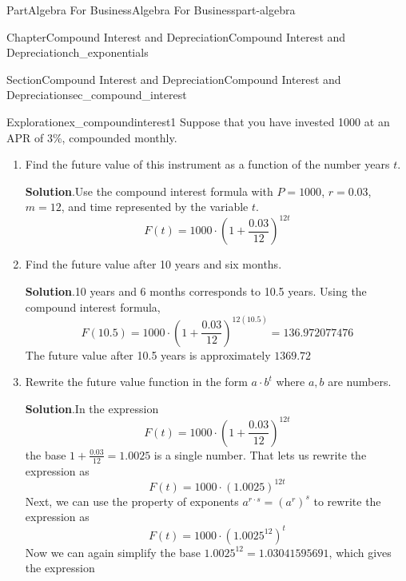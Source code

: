 \documentclass[oneside,10pt,]{tufte-book}
\newcommand{\blocktitlefont}{\relax}
\numberwithin{equation}{chapter}
\begin{document}
\begin{partptx}{Part}{Algebra For Business}{}{Algebra For Business}{}{}{part-algebra}
\begin{chapterptx}{Chapter}{Compound Interest and Depreciation}{}{Compound Interest and Depreciation}{}{}{ch_exponentials}
\begin{sectionptx}{Section}{Compound Interest and Depreciation}{}{Compound Interest and Depreciation}{}{}{sec_compound_interest}
\begin{exploration}{Exploration}{}{ex_compoundinterest1}%
Suppose that you have invested \textdollar{}1000 at an APR of 3\%, compounded monthly.%
\begin{enumerate}[font=\bfseries,label=(\alph*),ref=\alph*]%
\item{}Find the future value of this instrument as a function of the number years \(t\).%
\par\smallskip%
\noindent\textbf{\blocktitlefont Solution}.\hypertarget{ex_compoundinterest1-2-2}{}\quad{}Use the compound interest formula with \(P=1000\), \(r=0.03\), \(m=12\), and time represented by the variable \(t\).%
\begin{equation*}
F(t) = 1000\cdot \left( 1 + \frac{0.03}{12}\right)^{12 t}
\end{equation*}
%
\item{}Find the future value after 10 years and six months.%
\par\smallskip%
\noindent\textbf{\blocktitlefont Solution}.\hypertarget{ex_compoundinterest1-3-2}{}\quad{}10 years and 6 months corresponds to 10.5 years.  Using the compound interest formula,%
\begin{equation*}
F(10.5) = 1000\cdot \left( 1 + \frac{0.03}{12}\right)^{12 (10.5)} = 136.972077476
\end{equation*}
The future value after 10.5 years is approximately \textdollar{}\(1369.72\)%
\item{}Rewrite the future value function in the form \(a\cdot b^t\) where \(a,b\) are numbers.%
\par\smallskip%
\noindent\textbf{\blocktitlefont Solution}.\hypertarget{ex_compoundinterest1-4-2}{}\quad{}In the expression%
\begin{equation*}
F(t) = 1000\cdot \left( 1 + \frac{0.03}{12}\right)^{12 t}
\end{equation*}
the base \(1 + \frac{0.03}{12} = 1.0025 \) is a single number.  That lets us rewrite the expression as%
\begin{equation*}
F(t) = 1000\cdot \left( 1.0025 \right)^{12 t}
\end{equation*}
Next, we can use the property of exponents \(a^{r\cdot s} = {\left(a^{r}\right)}^s\) to rewrite the expression as%
\begin{equation*}
F(t) = 1000\cdot \left( 1.0025^{12} \right)^{t}
\end{equation*}
Now we can again simplify the base \(1.0025^{12} = 1.03041595691\), which gives the expression%
\begin{equation*}

\end{equation*}
\end{enumerate}
\end{exploration}
\end{sectionptx}
\end{chapterptx}
\end{partptx}
\end{document}

